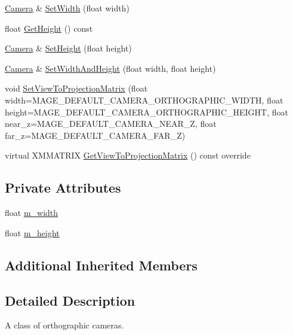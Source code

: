 \begin{DoxyCompactItemize}
\hyperlink{classmage_1_1_camera}{Camera} \& \hyperlink{classmage_1_1_orthographic_camera_a7687aef78ac2786be1c9ff69f396859a}{Set\+Width} (float width)
\item 
float \hyperlink{classmage_1_1_orthographic_camera_a596e2cf22fee8cf30139ffe9d4cdcda7}{Get\+Height} () const
\item 
\hyperlink{classmage_1_1_camera}{Camera} \& \hyperlink{classmage_1_1_orthographic_camera_ac9c1f87e2cf085b7c62d7f6e34eeb944}{Set\+Height} (float height)
\item 
\hyperlink{classmage_1_1_camera}{Camera} \& \hyperlink{classmage_1_1_orthographic_camera_a11319878a43113e54be50812a786343c}{Set\+Width\+And\+Height} (float width, float height)
\item 
void \hyperlink{classmage_1_1_orthographic_camera_a10e09af47e741ab76dc2aa2a03f04c06}{Set\+View\+To\+Projection\+Matrix} (float width=M\+A\+G\+E\+\_\+\+D\+E\+F\+A\+U\+L\+T\+\_\+\+C\+A\+M\+E\+R\+A\+\_\+\+O\+R\+T\+H\+O\+G\+R\+A\+P\+H\+I\+C\+\_\+\+W\+I\+D\+TH, float height=M\+A\+G\+E\+\_\+\+D\+E\+F\+A\+U\+L\+T\+\_\+\+C\+A\+M\+E\+R\+A\+\_\+\+O\+R\+T\+H\+O\+G\+R\+A\+P\+H\+I\+C\+\_\+\+H\+E\+I\+G\+HT, float near\+\_\+z=M\+A\+G\+E\+\_\+\+D\+E\+F\+A\+U\+L\+T\+\_\+\+C\+A\+M\+E\+R\+A\+\_\+\+N\+E\+A\+R\+\_\+Z, float far\+\_\+z=M\+A\+G\+E\+\_\+\+D\+E\+F\+A\+U\+L\+T\+\_\+\+C\+A\+M\+E\+R\+A\+\_\+\+F\+A\+R\+\_\+Z)
\item 
virtual X\+M\+M\+A\+T\+R\+IX \hyperlink{classmage_1_1_orthographic_camera_aedd86e56a0f7bc967ad8d9be2631a0cf}{Get\+View\+To\+Projection\+Matrix} () const override
\end{DoxyCompactItemize}
\subsection*{Private Attributes}
\begin{DoxyCompactItemize}
\item 
float \hyperlink{classmage_1_1_orthographic_camera_aadef4cff19cc1b1ecf427f82bbc3ea6a}{m\+\_\+width}
\item 
float \hyperlink{classmage_1_1_orthographic_camera_a63169098f604874c1b30c4b276b5a3e1}{m\+\_\+height}
\end{DoxyCompactItemize}
\subsection*{Additional Inherited Members}


\subsection{Detailed Description}
A class of orthographic cameras. 


